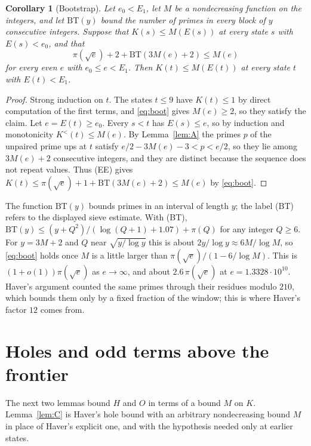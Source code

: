 \documentclass[11pt]{article}
\newtheorem{corollary}[theorem]{Corollary}
\theoremstyle{definition}
\theoremstyle{remark}
\begin{document}
\begin{corollary}[Bootstrap]\label{cor:A}
Let $e_0<E_1$, let $M$ be a nondecreasing function on the integers, and
let $\mathrm{BT}(y)$ bound the number of primes in every block of $y$
consecutive integers. Suppose that $K(s)\le M(E(s))$ at every state $s$
with $E(s)<e_0$, and that
\begin{equation}\label{eq:boot}
 \pi(\sqrt e)+2+\mathrm{BT}(3M(e)+2)\le M(e)
\end{equation}
for every even $e$ with $e_0\le e<E_1$. Then $K(t)\le M(E(t))$ at every
state $t$ with $E(t)<E_1$.
\end{corollary}

\begin{proof}
Strong induction on $t$. The states $t\le9$ have $K(t)\le1$ by direct
computation of the first terms, and \eqref{eq:boot} gives $M(e)\ge2$, so
they satisfy the claim. Let $e=E(t)\ge e_0$. Every $s<t$ has
$E(s)\le e$, so by induction and monotonicity $K^{<}(t)\le M(e)$. By
Lemma~\ref{lem:A} the primes $p$ of the unpaired prime ups at $t$ satisfy
$e/2-3M(e)-3<p<e/2$, so they lie among $3M(e)+2$ consecutive integers,
and they are distinct because the sequence does not repeat values. Thus
(EE) gives $K(t)\le\pi(\sqrt e)+1+\mathrm{BT}(3M(e)+2)\le M(e)$ by
\eqref{eq:boot}.
\end{proof}

The function $\mathrm{BT}(y)$ bounds primes in an interval of length $y$;
the label (BT) refers to the displayed sieve estimate.
With (BT), $\mathrm{BT}(y)\le (y+Q^2)/(\log(Q+1)+1.07)+\pi(Q)$ for any
integer $Q\ge6$. For $y=3M+2$ and $Q$ near $\sqrt{y/\log y}$ this is about
$2y/\log y\approx6M/\log M$, so \eqref{eq:boot} holds once $M$ is a little larger than
$\pi(\sqrt e)/(1-6/\log M)$. This is $(1+o(1))\pi(\sqrt e)$ as
$e\to\infty$, and about $2.6\,\pi(\sqrt e)$ at $e=1.3328\cdot10^{10}$. Haver's argument counted the same primes through their
residues modulo $210$, which bounds them only by a fixed fraction of the
window; this is where Haver's factor $12$ comes from.

\section{Holes and odd terms above the frontier}\label{sec:HO}

The next two lemmas bound $H$ and $O$ in terms of a bound $M$ on $K$.
Lemma~\ref{lem:C} is Haver's hole bound \cite[Theorem~11]{haver} with an
arbitrary nondecreasing bound $M$ in place of Haver's explicit one, and with the
hypothesis needed only at earlier states.
\end{document}
